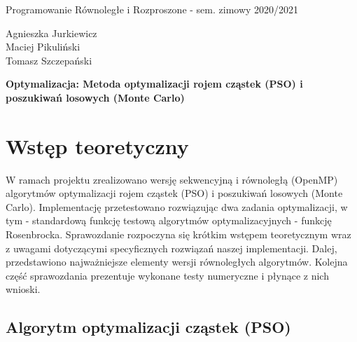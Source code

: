 \documentclass[11pt, a4paper, oneside]{article}
\begin{document}
\hspace*{-\parindent}%
\begin{minipage}{\textwidth}
  \begin{minipage}{.7\textwidth}
   \begin{flushleft}
	Programowanie Równoległe i Rozproszone - sem. zimowy 2020/2021
	\end{flushleft}
  \end{minipage}
  \begin{minipage}{.3\textwidth}
    \begin{flushright}
	Agnieszka Jurkiewicz \\
	Maciej Pikuliński \\
	Tomasz Szczepański
	\end{flushright}
  \end{minipage}%
\end{minipage}
\begin{center}
{\Large \textbf{Optymalizacja: Metoda optymalizacji rojem cząstek (PSO) i poszukiwań losowych (Monte Carlo)}}
\end{center}

\section{Wstęp teoretyczny}
 
W ramach projektu zrealizowano wersję sekwencyjną i równoległą (OpenMP) algorytmów optymalizacji rojem cząstek (PSO) i poszukiwań losowych (Monte Carlo). Implementację przetestowano rozwiązując dwa zadania optymalizacji, w tym - standardową funkcję testową algorytmów optymalizacyjnych - funkcję Rosenbrocka. Sprawozdanie rozpoczyna się krótkim wstępem teoretycznym wraz z uwagami dotyczącymi specyficznych rozwiązań naszej implementacji. Dalej, przedstawiono najważniejsze elementy wersji równoległych algorytmów. Kolejna część sprawozdania prezentuje wykonane testy numeryczne i płynące z nich wnioski.

\subsection{Algorytm optymalizacji cząstek (PSO)} 
\end{document}
